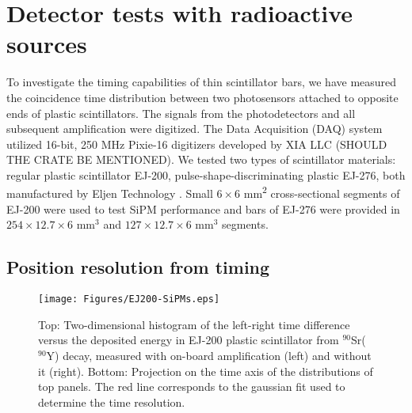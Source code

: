 \section{Detector tests with radioactive sources}

To  investigate the timing capabilities of thin scintillator bars, we have measured the coincidence time distribution between two photosensors attached to opposite ends of plastic scintillators. The signals from the photodetectors and all subsequent amplification were digitized. The Data Acquisition (DAQ) system utilized 16-bit, 250 MHz Pixie-16 digitizers developed by XIA LLC \cite{XIA} (SHOULD THE CRATE BE MENTIONED).
We tested two types of scintillator materials: regular plastic scintillator EJ-200, pulse-shape-discriminating plastic EJ-276, both manufactured by Eljen Technology \cite{eljen}. Small $6\times6$ mm\textsuperscript{2} cross-sectional segments of EJ-200 were used to test SiPM performance and bars of EJ-276 were provided in $254\times12.7\times6$ mm$^{3}$ and $127\times12.7\times6$ mm$^{3}$ segments.



\subsection{Position resolution from timing}
\begin{figure}[hbt]
\centering
\texttt{[image: Figures/EJ200-SiPMs.eps]}
\caption{Top: Two-dimensional histogram of the left-right time difference versus the deposited energy in EJ-200 plastic scintillator from $^{90}$Sr($^{90}$Y) decay, measured with on-board amplification (left) and without it (right). Bottom: Projection on the time axis of the  distributions of top panels. The red line corresponds to the gaussian fit used to determine the time resolution.}
\label{fig:SiPMtiming}
\end{figure}

